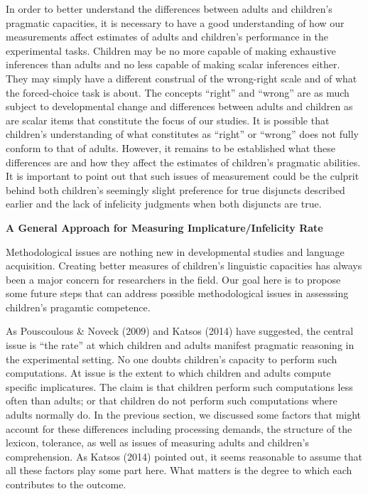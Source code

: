 \documentclass[floatsintext,man]{apa6}
\theoremstyle{definition}
\theoremstyle{definition}
\theoremstyle{definition}
\theoremstyle{remark}
\begin{document}
In order to better understand the differences between adults and
children's pragmatic capacities, it is necessary to have a good
understanding of how our measurements affect estimates of adults and
children's performance in the experimental tasks. Children may be no
more capable of making exhaustive inferences than adults and no less
capable of making scalar inferences either. They may simply have a
different construal of the wrong-right scale and of what the
forced-choice task is about. The concepts \enquote{right} and
\enquote{wrong} are as much subject to developmental change and
differences between adults and children as are scalar items that
constitute the focus of our studies. It is possible that children's
understanding of what constitutes as \enquote{right} or \enquote{wrong}
does not fully conform to that of adults. However, it remains to be
established what these differences are and how they affect the estimates
of children's pragmatic abilities. It is important to point out that
such issues of measurement could be the culprit behind both children's
seemingly slight preference for true disjuncts described earlier and the
lack of infelicity judgments when both disjuncts are true.

\textbf{A General Approach for Measuring Implicature/Infelicity Rate}

Methodological issues are nothing new in developmental studies and
language acquisition. Creating better measures of children's linguistic
capacities has always been a major concern for researchers in the field.
Our goal here is to propose some future steps that can address possible
methodological issues in assesssing children's pragamtic competence.

As Pouscoulous \& Noveck (2009) and Katsos (2014) have suggested, the
central issue is \enquote{the rate} at which children and adults
manifest pragmatic reasoning in the experimental setting. No one doubts
children's capacity to perform such computations. At issue is the extent
to which children and adults compute specific implicatures. The claim is
that children perform such computations less often than adults; or that
children do not perform such computations where adults normally do. In
the previous section, we discussed some factors that might account for
these differences including processing demands, the structure of the
lexicon, tolerance, as well as issues of measuring adults and children's
comprehension. As Katsos (2014) pointed out, it seems reasonable to
assume that all these factors play some part here. What matters is the
degree to which each contributes to the outcome.
\end{document}
